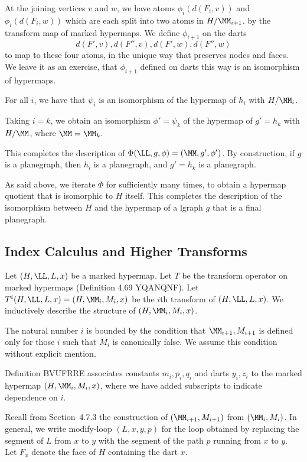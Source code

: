 At the joining vertices $v$ and $w$, we have atoms $\phi_i(d(F_i,v))$
and $\phi_i(d(F_i,w))$ which are each split into two atoms in
$H/\MM_{i+1}$.  by the transform map of marked hypermaps.  We define
$\phi_{i+1}$ on the darts
\[
d(F',v), d(F'',v), d(F',w), d(F'',w)
\]
to map to these four atoms, in the unique way that preserves nodes and
faces.  We leave it as an exercise, that $\phi_{i+1}$ defined on darts
this way is an isomorphism of hypermaps.

\begin{lemma} For all $i$, we have that 
$\psi_{i}$ is an isomorphism of the hypermap
of $h_{i}$  with $H/\MM_i$.
\end{lemma} 

Taking $i=k$, we obtain an isomorphism $\phi'=\psi_k$ of
the hypermap of $g'=h_k$ with $H/\MM$, where $\MM=\MM_k$.

This completes the description of $\Phi(\LL,g,\phi) = (\MM,g',\phi')$.
By construction, if $g$ is a planegraph, then $h_i$ is a planegraph,
and $g' = h_k$ is a planegraph.

As said above, we iterate $\Phi$ for sufficiently many times, to obtain a
hypermap quotient that is isomorphic to $H$ itself.
This completes the description of the isomorphism between
$H$ and the hypermap of a  lgraph $g$ that is a final planegraph.


\subsection{Index Calculus and Higher Transforms}


Let $(H,\LL,L,x)$ be a marked hypermap.  
Let $T$ be the transform operator on marked hypermaps
(Definition 4.69 YQANQNF).  
Let $T^i(H,\LL,L,x) = (H,\MM_i,M_i,x)$ be the $i$th transform of
$(H,\LL,L,x)$.  We inductively describe the structure of $(H,\MM_i,M_i,x)$.

The natural number $i$ is bounded by the condition that $\MM_{i+1},M_{i+1}$ is defined only for those $i$ such that $M_i$ is canonically false.
We assume this condition without explicit mention.

Definition BVUFRRE associates constants $m_i,p_i,q_i$ and darts $y_i,z_i$
to the marked hypermap $(H,\MM_i,M_i,x)$, where we have added
subscripts to indicate dependence on $i$.


Recall from Section~4.7.3 the construction of $(\MM_{i+1},M_{i+1})$
from $(\MM_i,M_i)$. 
In general, we write modify-loop $(L,x,y,p)$ for the loop obtained
by replacing the segment of $L$ from $x$ to $y$ with the segment
of the path $p$ running from $x$ to $y$.
Let $F_x$ denote the face of $H$ containing the dart $x$. 

